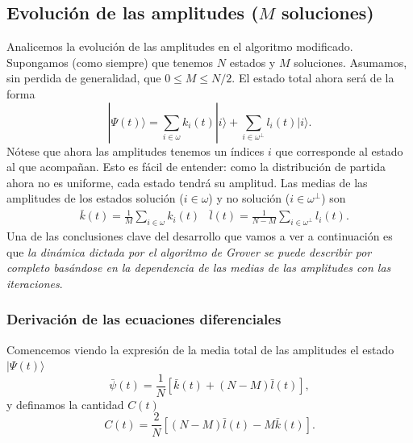 \documentclass[a4paper,11pt]{article} %
\numberwithin{equation}{section}
\def\lc{\left[}
\def\rc{\right]}
\begin{document}
\subsection{Evolución de las amplitudes ($M$ soluciones)}

Analicemos la evolución de las amplitudes en el algoritmo modificado. Supongamos (como siempre) que tenemos $N$ estados y $M$ soluciones. Asumamos, sin perdida de generalidad, que $0 \leq M \leq N/2$. El estado total ahora será de la forma
\begin{equation} \label{ec_prob-no-uni_phi-j}
\boxed{|\Psi(t) \rangle = \sum_{i \in \omega} k_i(t) |i \rangle + \sum_{i \in \omega^\perp} l_i(t) |i \rangle }.
\end{equation}
Nótese que ahora las amplitudes tenemos un índices $i$ que corresponde al estado al que acompañan. Esto es fácil de entender: como la distribución de partida ahora no es uniforme, cada estado tendrá su amplitud. Las medias de las amplitudes de los estados solución ($i \in \omega$) y no solución ($i \in \omega^\perp$) son
\begin{align} \label{ec_prop-no-uni_k-l-mean}
& \boxed{\bar{k}(t) = \frac{1}{M} \sum_{i \in \omega} k_i(t) }
& \boxed{\bar{l}(t) = \frac{1}{N-M} \sum_{i \in \omega^\perp} l_i(t)}.
\end{align}
Una de las conclusiones clave del desarrollo que vamos a ver a continuación es que \textit{la dinámica dictada por el algoritmo de Grover se puede describir por completo basándose en la dependencia de las medias de las amplitudes con las iteraciones}.

\subsubsection{Derivación de las ecuaciones diferenciales} \label{subsec_prop-no-uni_ecuaciones-diff}

Comencemos viendo la expresión de la media total de las amplitudes el estado $|\Psi(t) \rangle$
\begin{equation}
\bar{\psi}(t) = \frac{1}{N} \lc \bar{k}(t) + (N-M) \bar{l}(t) \rc,
\end{equation}
y definamos la cantidad $C(t)$
\begin{equation}
C(t) = \frac{2}{N} \lc (N-M) \bar{l}(t) - M \bar{k}(t) \rc.
\end{equation}
\end{document}
